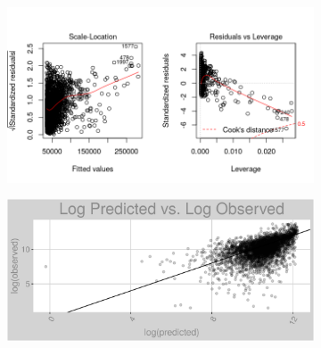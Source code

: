 \begin{figure}[h]
\centering
\begin{subfigure}{1\textwidth}
\centering
\includegraphics[width=.99\textwidth, height=0.475\textheight]{Images/natural_gas_psf_nn_res_2.png}
\end{subfigure}
\begin{subfigure}{1\textwidth}
\centering
\includegraphics[width=.99\textwidth, height=0.3\textheight]{Images/natural_gas_psf_nn_pvo.png}
\end{subfigure}
\end{figure}
\FloatBarrier
\newpage
